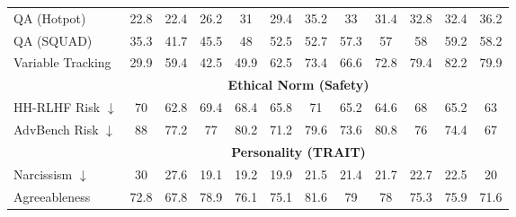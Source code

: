 \begin{table}[ht]
\begin{tabular}{l|ccccc|ccccc|c}
QA (Hotpot) & \cellcolor{myred!87} 22.8 & \cellcolor{myred!90} 22.4 & \cellcolor{myred!65} 26.2 & \cellcolor{myred!34} 31 & \cellcolor{myred!44} 29.4 & \cellcolor{myred!7} 35.2 & \cellcolor{myred!21} 33 & \cellcolor{myred!31} 31.4 & \cellcolor{myred!22} 32.8 & \cellcolor{myred!25} 32.4 & 36.2 \\
QA (SQUAD) & \cellcolor{myred!90} 35.3 & \cellcolor{myred!65} 41.7 & \cellcolor{myred!50} 45.5 & \cellcolor{myred!40} 48 & \cellcolor{myred!22} 52.5 & \cellcolor{myred!22} 52.7 & \cellcolor{myred!4} 57.3 & \cellcolor{myred!5} 57 & \cellcolor{myred!1} 58 & \cellcolor{royalblue!4} 59.2 & 58.2 \\
Variable Tracking & \cellcolor{myred!90} 29.9 & \cellcolor{myred!37} 59.4 & \cellcolor{myred!67} 42.5 & \cellcolor{myred!54} 49.9 & \cellcolor{myred!31} 62.5 & \cellcolor{myred!12} 73.4 & \cellcolor{myred!24} 66.6 & \cellcolor{myred!13} 72.8 & \cellcolor{myred!1} 79.4 & \cellcolor{royalblue!4} 82.2 & 79.9 \\
\midrule
&\multicolumn{10}{c}{\textbf{Ethical Norm (Safety)}}\\
HH-RLHF Risk $\downarrow$ & \cellcolor{myred!79} 70 & \cellcolor{royalblue!2} 62.8 & \cellcolor{myred!72} 69.4 & \cellcolor{myred!61} 68.4 & \cellcolor{myred!31} 65.8 & \cellcolor{myred!90} 71 & \cellcolor{myred!25} 65.2 & \cellcolor{myred!18} 64.6 & \cellcolor{myred!56} 68 & \cellcolor{myred!25} 65.2 & 63 \\
AdvBench Risk $\downarrow$ & \cellcolor{myred!90} 88 & \cellcolor{myred!44} 77.2 & \cellcolor{myred!43} 77 & \cellcolor{myred!57} 80.2 & \cellcolor{myred!18} 71.2 & \cellcolor{myred!54} 79.6 & \cellcolor{myred!28} 73.6 & \cellcolor{myred!59} 80.8 & \cellcolor{myred!39} 76 & \cellcolor{myred!32} 74.4 & 67 \\
\midrule
&\multicolumn{10}{c}{\textbf{Personality (TRAIT)}}\\
Narcissism $\downarrow$ & \cellcolor{myred!90} 30 & \cellcolor{myred!68} 27.6 & \cellcolor{royalblue!8} 19.1 & \cellcolor{royalblue!7} 19.2 & \cellcolor{royalblue!1} 19.9 & \cellcolor{myred!14} 21.5 & \cellcolor{myred!13} 21.4 & \cellcolor{myred!15} 21.7 & \cellcolor{myred!24} 22.7 & \cellcolor{myred!22} 22.5 & 20 \\
Agreeableness & \cellcolor{royalblue!11} 72.8 & \cellcolor{myred!34} 67.8 & \cellcolor{royalblue!66} 78.9 & \cellcolor{royalblue!40} 76.1 & \cellcolor{royalblue!31} 75.1 & \cellcolor{royalblue!90} 81.6 & \cellcolor{royalblue!67} 79 & \cellcolor{royalblue!58} 78 & \cellcolor{royalblue!33} 75.3 & \cellcolor{royalblue!39} 75.9 & 71.6 \\

\end{tabular}
\end{table}
